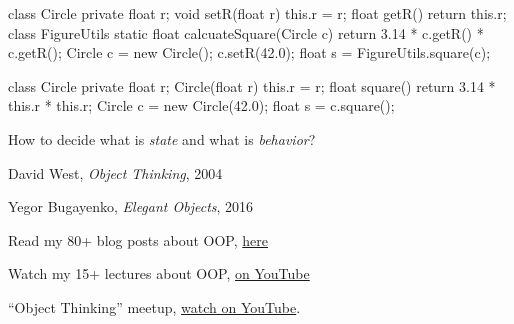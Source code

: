 \documentclass{article}
\begin{document}
\begin{pptWide}{2}
{\small\begin{ffcode}
class Circle {
  private float r;
  void setR(float r) { this.r = r; }
  float getR() { return this.r; }
}
class FigureUtils {
  static float calcuateSquare(Circle c) {
    return 3.14 * c.getR() * c.getR();
  }
}
Circle c = new Circle();
c.setR(42.0);
float s = FigureUtils.square(c);
\end{ffcode}
}
\par\columnbreak\par
{\small\begin{ffcode}
class Circle {
  private float r;
  Circle(float r) { this.r = r; }
  float square() {
    return 3.14 * this.r * this.r;
  }
}
Circle c = new Circle(42.0);
float s = c.square();
\end{ffcode}
}\par
How to decide what is \emph{state} and what is \emph{behavior}?
\end{pptWide}
\plush{}







David West, \emph{Object Thinking}, 2004

Yegor Bugayenko, \emph{Elegant Objects}, 2016

Read my 80+ blog posts about OOP, \href{https://www.yegor256.com/tag/oop}{here}

Watch my 15+ lectures about OOP, \href{https://www.youtube.com/playlist?list=PLaIsQH4uc08yw2CsNv5OV30GfKE6XVGii}{on YouTube}

``Object Thinking'' meetup, \href{https://www.youtube.com/watch?v=yT6oO28wEik&list=PLaIsQH4uc08yetzX86w1pPck1QtGEy_ik}{watch on YouTube}.
\end{document}

